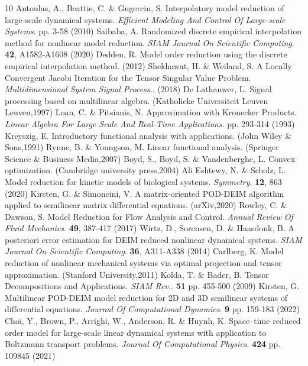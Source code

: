 \documentclass{article}
\begin{document}
\begin{thebibliography}{10}
Antoulas, A., Beattie, C. \& Gugercin, S. Interpolatory model reduction of large-scale dynamical systems. {\em Efficient Modeling And Control Of Large-scale Systems}. pp. 3-58 (2010)
Saibaba, A. Randomized discrete empirical interpolation method for nonlinear model reduction. {\em SIAM Journal On Scientific Computing}. \textbf{42}, A1582-A1608 (2020)
Dedden, R. Model order reduction using the discrete empirical interpolation method.  (2012)
Shekhawat, H. \& Weiland, S. A Locally Convergent Jacobi Iteration for the Tensor Singular Value Problem. {\em Multidimensional System Signal Process.}. (2018)
De Lathauwer, L. Signal processing based on multilinear algebra. (Katholieke Universiteit Leuven Leuven,1997)
Loan, C. \& Pitsianis, N. Approximation with Kronecker Products. {\em Linear Algebra For Large Scale And Real-Time Applications}. pp. 293-314 (1993)
Kreyszig, E. Introductory functional analysis with applications. (John Wiley \& Sons,1991)
Rynne, B. \& Youngson, M. Linear functional analysis. (Springer Science \& Business Media,2007)
Boyd, S., Boyd, S. \& Vandenberghe, L. Convex optimization. (Cambridge university press,2004)
Ali Eshtewy, N. \& Scholz, L. Model reduction for kinetic models of biological systems. {\em Symmetry}. \textbf{12}, 863 (2020)
Kirsten, G. \& Simoncini, V. A matrix-oriented POD-DEIM algorithm applied to semilinear matrix differential equations. (arXiv,2020)
Rowley, C. \& Dawson, S. Model Reduction for Flow Analysis and Control. {\em Annual Review Of Fluid Mechanics}. \textbf{49}, 387-417 (2017)
Wirtz, D., Sorensen, D. \& Haasdonk, B. A posteriori error estimation for DEIM reduced nonlinear dynamical systems. {\em SIAM Journal On Scientific Computing}. \textbf{36}, A311-A338 (2014)
Carlberg, K. Model reduction of nonlinear mechanical systems via optimal projection and tensor approximation. (Stanford University,2011)
Kolda, T. \& Bader, B. Tensor Decompositions and Applications. {\em SIAM Rev.}. \textbf{51} pp. 455-500 (2009)
Kirsten, G. Multilinear POD-DEIM model reduction for 2D and 3D semilinear systems of differential equations. {\em Journal Of Computational Dynamics}. \textbf{9} pp. 159-183 (2022)
Choi, Y., Brown, P., Arrighi, W., Anderson, R. \& Huynh, K. Space–time reduced order model for large-scale linear dynamical systems with application to Boltzmann transport problems. {\em Journal Of Computational Physics}. \textbf{424} pp. 109845 (2021)

\end{thebibliography}
\end{document}
